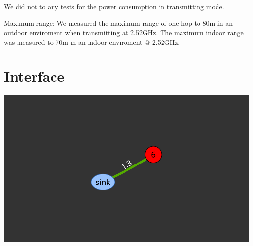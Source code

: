 \documentclass[a4paper,11pt]{article}
\begin{document}
We did not to any tests for the power consumption in transmitting
mode.

Maximum range:
We measured the maximum range of one hop to 80m in an outdoor 
enviroment when transmitting at 2.52GHz. 
The maximum indoor range was measured to 70m in an indoor
enviroment @ 2.52GHz.
 

\section{Interface}
\begin{center}
\includegraphics[width=.5\textwidth]{map}
\end{center}
\end{document}
